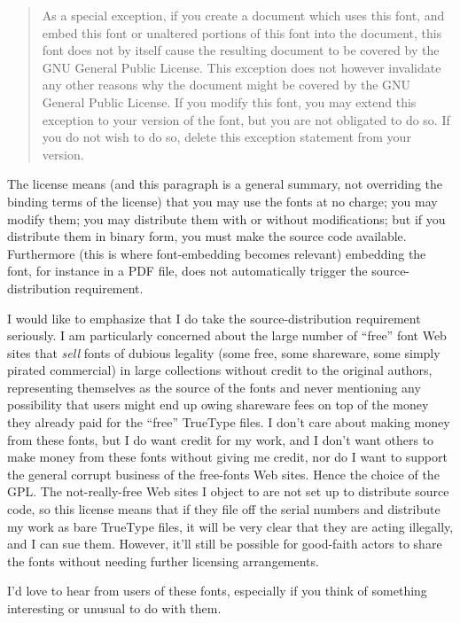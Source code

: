 \documentclass[12pt]{article}
\begin{document}
\begin{quotation}
As a special exception, if you create a document which uses this font, and
embed this font or unaltered portions of this font into the document, this
font does not by itself cause the resulting document to be covered by the
GNU General Public License. This exception does not however invalidate any
other reasons why the document might be covered by the GNU General Public
License. If you modify this font, you may extend this exception to your
version of the font, but you are not obligated to do so. If you do not wish
to do so, delete this exception statement from your version.
\end{quotation}

The license means (and this paragraph is a general summary, not overriding
the binding terms of the license) that you may use the fonts at no charge;
you may modify them; you may distribute them with or without modifications;
but if you distribute them in binary form, you must make the source code
available.  Furthermore (this is where font-embedding becomes relevant)
embedding the font, for instance in a PDF file, does not automatically
trigger the source-distribution requirement.

I would like to emphasize that I do take the source-distribution
requirement seriously.  I am particularly concerned about the large number
of ``free'' font Web sites that \emph{sell} fonts of dubious legality (some
free, some shareware, some simply pirated commercial) in large collections
without credit to the original authors, representing themselves as the
source of the fonts and never mentioning any possibility that users might
end up owing shareware fees on top of the money they already paid for the
``free'' TrueType files.  I don't care about making money from these fonts,
but I do want credit for my work, and I don't want others to make money from
these fonts without giving me credit, nor do I want to support the general
corrupt business of the free-fonts Web sites. Hence the choice of the GPL. 
The not-really-free Web sites I object to are not set up to distribute
source code, so this license means that if they file off the serial numbers
and distribute my work as bare TrueType files, it will be very clear that
they are acting illegally, and I can sue them.  However, it'll still be
possible for good-faith actors to share the fonts without needing further
licensing arrangements.

I'd love to hear from users of these fonts, especially if you think of
something interesting or unusual to do with them.
\end{document}
